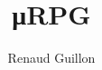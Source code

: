 \documentclass[a4paper,twocolumn,10pt]{article}
\title{\si\micro RPG}
\author{Renaud Guillon}
\begin{document}
\maketitle{}






\end{document}
